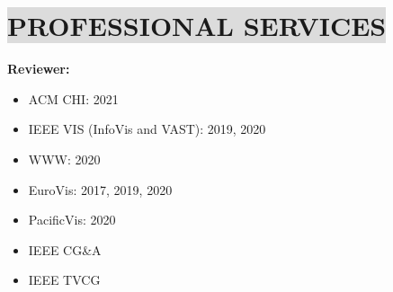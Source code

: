 \section*{
    \colorbox{gainsboro}{PROFESSIONAL SERVICES}
}
\textbf{Reviewer:}
\vspace{-3mm}
\begin{itemize}[leftmargin=5mm,noitemsep,itemsep=0pt]
    \item ACM CHI: 2021
    \item IEEE VIS (InfoVis and VAST): 2019, 2020
    \item WWW: 2020
    \item EuroVis: 2017, 2019, 2020
    \item PacificVis: 2020
    \item IEEE CG\&A
    \item IEEE TVCG
\end{itemize}